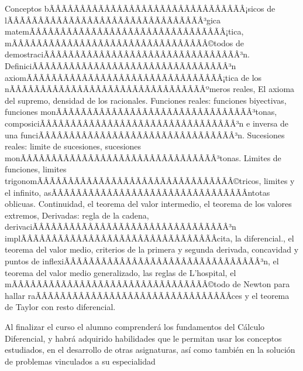 \begin{sumilla}


\begin{fundamentacion}
Conceptos bÃÂÃÂÃÂÃÂÃÂÃÂÃÂÃÂÃÂÃÂÃÂÃÂÃÂÃÂÃÂÃÂ¡sicos de lÃÂÃÂÃÂÃÂÃÂÃÂÃÂÃÂÃÂÃÂÃÂÃÂÃÂÃÂÃÂÃÂ³gica matemÃÂÃÂÃÂÃÂÃÂÃÂÃÂÃÂÃÂÃÂÃÂÃÂÃÂÃÂÃÂÃÂ¡tica, mÃÂÃÂÃÂÃÂÃÂÃÂÃÂÃÂÃÂÃÂÃÂÃÂÃÂÃÂÃÂÃÂ©todos de demostraciÃÂÃÂÃÂÃÂÃÂÃÂÃÂÃÂÃÂÃÂÃÂÃÂÃÂÃÂÃÂÃÂ³n. DefiniciÃÂÃÂÃÂÃÂÃÂÃÂÃÂÃÂÃÂÃÂÃÂÃÂÃÂÃÂÃÂÃÂ³n axiomÃÂÃÂÃÂÃÂÃÂÃÂÃÂÃÂÃÂÃÂÃÂÃÂÃÂÃÂÃÂÃÂ¡tica de los nÃÂÃÂÃÂÃÂÃÂÃÂÃÂÃÂÃÂÃÂÃÂÃÂÃÂÃÂÃÂÃÂºmeros reales, El axioma del supremo, densidad de los racionales. Funciones reales: funciones biyectivas, funciones monÃÂÃÂÃÂÃÂÃÂÃÂÃÂÃÂÃÂÃÂÃÂÃÂÃÂÃÂÃÂÃÂ³tonas, composiciÃÂÃÂÃÂÃÂÃÂÃÂÃÂÃÂÃÂÃÂÃÂÃÂÃÂÃÂÃÂÃÂ³n e inversa de una funciÃÂÃÂÃÂÃÂÃÂÃÂÃÂÃÂÃÂÃÂÃÂÃÂÃÂÃÂÃÂÃÂ³n. Sucesiones reales: limite de sucesiones, sucesiones monÃÂÃÂÃÂÃÂÃÂÃÂÃÂÃÂÃÂÃÂÃÂÃÂÃÂÃÂÃÂÃÂ³tonas.  Limites de funciones, limites trigonomÃÂÃÂÃÂÃÂÃÂÃÂÃÂÃÂÃÂÃÂÃÂÃÂÃÂÃÂÃÂÃÂ©tricos, limites y el infinito, asÃÂÃÂÃÂÃÂÃÂÃÂÃÂÃÂÃÂÃÂÃÂÃÂÃÂÃÂÃÂÃÂ­ntotas  oblicuas. Continuidad, el teorema del valor intermedio, el teorema de los valores extremos, Derivadas: regla de la cadena, derivaciÃÂÃÂÃÂÃÂÃÂÃÂÃÂÃÂÃÂÃÂÃÂÃÂÃÂÃÂÃÂÃÂ³n implÃÂÃÂÃÂÃÂÃÂÃÂÃÂÃÂÃÂÃÂÃÂÃÂÃÂÃÂÃÂÃÂ­cita, la diferencial., el teorema del valor medio, criterios de la primera y segunda derivada, concavidad y puntos de inflexiÃÂÃÂÃÂÃÂÃÂÃÂÃÂÃÂÃÂÃÂÃÂÃÂÃÂÃÂÃÂÃÂ³n, el teorema del valor medio generalizado, las reglas de L'hospital, el mÃÂÃÂÃÂÃÂÃÂÃÂÃÂÃÂÃÂÃÂÃÂÃÂÃÂÃÂÃÂÃÂ©todo de Newton para hallar raÃÂÃÂÃÂÃÂÃÂÃÂÃÂÃÂÃÂÃÂÃÂÃÂÃÂÃÂÃÂÃÂ­ces y el  teorema de Taylor  con resto diferencial.
\end{fundamentacion}

\begin{objetivosdelcurso}
\item Al finalizar el curso el alumno comprender\'a los fundamentos del C\'alculo Diferencial, y habr\'a adquirido habilidades que le permitan usar los conceptos estudiados, en el desarrollo de otras asignaturas, as\'i como tambi\'en en la soluci\'on de problemas vinculados a su especialidad 
\end{objetivosdelcurso}


\end{sumilla}
